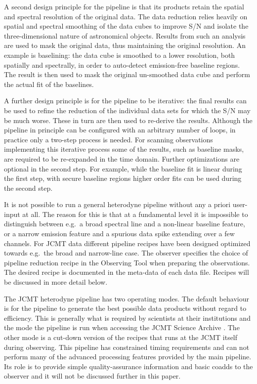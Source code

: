 \documentclass[final,authoryear,5p,times,twocolumn]{elsarticle}
\begin{document}
A second design principle for the pipeline is that its products
retain the spatial and spectral resolution of the original data.  The
data reduction relies heavily on spatial and spectral smoothing of the
data cubes to improve S/N and isolate the three-dimensional nature of astronomical
objects. Results from such an analysis are used to mask the original
data, thus maintaining the original resolution. An example is
baselining: the data cube is smoothed to a lower resolution,
both spatially and spectrally, in order to auto-detect emission-free
baseline regions. The result is then used to mask the original
un-smoothed data cube and perform the actual fit of the baselines.

A further design principle is for the pipeline to be iterative: the
final results can be used to refine the reduction of the individual data
sets for which the S/N may be much worse. These in turn are then used
to re-derive the results. Although the pipeline in principle can be
configured with an arbitrary number of loops, in practice only a
two-step process is needed. For scanning observations implementing
this iterative process some of the results, such as baseline masks,
are required to be re-expanded in the time domain. Further optimizations are optional in
the second step. For example, while the baseline fit is linear
during the first step, with secure baseline regions higher order fits
can be used during the second step.

It is not possible to run a general heterodyne pipeline without any a
priori user-input at all. The reason for this is that at a fundamental
level it is impossible to distinguish between e.g.\ a broad spectral
line and a non-linear baseline feature, or a narrow emission feature
and a spurious data spike extending over a few channels. For JCMT data
different pipeline recipes have been designed optimized towards
e.g.\ the broad and narrow-line case. The observer specifies the choice
of pipeline reduction recipe in the Observing Tool when preparing the
observations. The desired recipe is documented in the meta-data of
each data file. Recipes will be discussed in more detail below.

The JCMT heterodyne pipeline has two operating modes. The default
behaviour is for the pipeline to generate the best possible data
products without regard to efficiency. This is generally what is
required by scientists at their institutions and the mode the pipeline is run
when accessing the JCMT Science Archive
\citep[JSA;][]{2015Economou,2008ASPC..394..565J}. The other mode is a
cut-down version of the recipes that runs at the JCMT itself during
observing. This pipeline has constrained timing requirements and can
not perform many of the advanced processing features provided by the
main pipeline. Its role is to provide simple quality-assurance
information and basic coadds to the observer and it will not be
discussed further in this paper.
\end{document}
